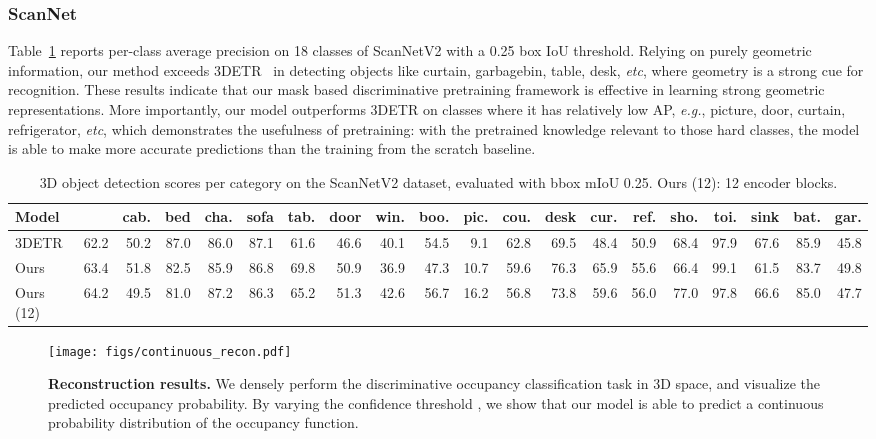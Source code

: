 \documentclass[runningheads]{llncs}
\begin{document}
\subsubsection{ScanNet} 

Table~\ref{tab:scannet-class} reports per-class average precision
on 18 classes of ScanNetV2 with a 0.25 box IoU
threshold. Relying on purely geometric information,
our method exceeds 3DETR~\cite{misra2021-3detr} in detecting objects like curtain, garbagebin, table, desk, \textit{etc}, where geometry is a
strong cue for recognition.  These results indicate that our mask based discriminative pretraining framework is effective in learning strong geometric representations.
More importantly, our model outperforms 3DETR on classes where it has relatively low AP, \textit{e.g.}, picture, door, curtain, refrigerator, \textit{etc}, which demonstrates the usefulness of pretraining: with the pretrained knowledge relevant to those hard classes, the model is able to make more accurate predictions than the training from the scratch baseline.


\begin{table}[!htp]
\centering
\begin{adjustbox}{width=\columnwidth,center}
\begin{tabular}{l|c|rrrrrrrrrrrrrrrrrr}\toprule
Model &   &cab. &bed &cha. &sofa &tab. &door &win. &boo. &pic. &cou. &desk &cur. &ref. &sho. &toi. &sink &bat. &gar.\\
\midrule
3DETR~\cite{misra2021-3detr} &62.2&50.2 &87.0 &86.0 &87.1 &61.6 &46.6 &40.1 &54.5 &9.1 &62.8 &69.5 &48.4 &50.9 &68.4 &97.9 &67.6 &85.9 &45.8 \\
Ours &63.4&51.8 &82.5 &85.9 &86.8 &69.8 &50.9 &36.9 &47.3 &10.7 &59.6 &76.3 &65.9 &55.6 &66.4 &99.1 &61.5 &83.7 &49.8 \\
Ours (12) &64.2&49.5 &81.0 &87.2 &86.3 &65.2 &51.3 &42.6 &56.7 &16.2 &56.8 &73.8 &59.6 &56.0 &77.0 &97.8 &66.6 &85.0 &47.7 \\
\bottomrule
\end{tabular}
\end{adjustbox}
\caption{3D object detection scores per category on the ScanNetV2 dataset, evaluated with bbox mIoU 0.25.  Ours (12): 12 encoder blocks.}
\label{tab:scannet-class}
\end{table}

\begin{figure}[t!]
    \centering
    \texttt{[image: figs/continuous\_recon.pdf]}
    \caption{\textbf{Reconstruction results.}
        We densely perform the discriminative occupancy classification task in 3D space, and visualize the predicted occupancy probability.  By varying the confidence threshold , we show that our model is able to predict a continuous probability distribution of the occupancy function.
    }
    \label{fig:continuous_reconstruction}
\end{figure}
\end{document}
